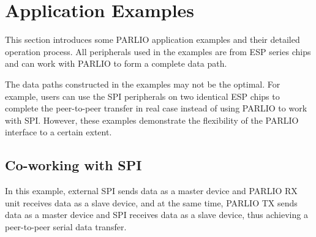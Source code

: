 \documentclass[main\_\_EN.tex]{subfiles}
\begin{document}
\section{Application Examples}
\label{sec:parlio-application-example}
This section introduces some PARLIO application examples and their detailed operation process. All peripherals used in the examples are from ESP series chips and can work with PARLIO to form a complete data path. 

\begin{tiplisting}
The data paths constructed in the examples may not be the optimal. For example, users can use the SPI peripherals on two identical ESP chips to complete the peer-to-peer transfer in real case instead of using PARLIO to work with SPI. However, these examples demonstrate the flexibility of the PARLIO interface to a certain extent.
\end{tiplisting}

\subsection{Co-working with SPI}
In this example, external SPI sends data as a master device and PARLIO RX unit receives data as a slave device, and at the same time, PARLIO TX sends data as a master device and SPI receives data as a slave device, thus achieving a peer-to-peer serial data transfer. 
\end{document}
